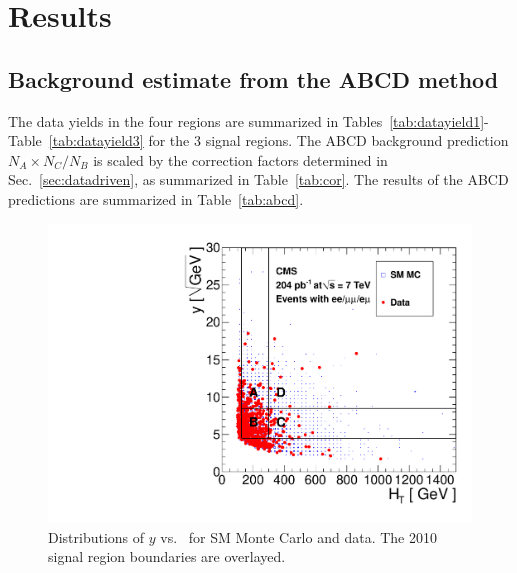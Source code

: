 \section{Results}
\label{sec:results}

\subsection{Background estimate from the ABCD method}
\label{sec:abcdres}

The data yields in the 
four regions are summarized in Tables~\ref{tab:datayield1}-Table~\ref{tab:datayield3}
for the 3 signal regions. The ABCD background prediction $N_A \times N_C / N_B$ is scaled
by the correction factors determined in Sec.~\ref{sec:datadriven}, as summarized in Table~\ref{tab:cor}.
The results of the ABCD predictions are summarized in Table~\ref{tab:abcd}.
\newpage

\begin{figure}[tbh]
\begin{center}
\includegraphics[width=0.6\linewidth]{plots/abcd_204pb_2010.pdf}
\caption{\label{fig:abcdData1}\protect Distributions of $y$ 
vs. \Ht\ for SM Monte Carlo and data. The 2010 signal region boundaries are overlayed.}
\end{center}
\end{figure}

